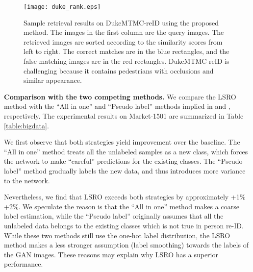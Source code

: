 \documentclass[10pt,twocolumn,letterpaper]{article}
\begin{document}
\begin{figure}
\begin{center}
\texttt{[image: duke\_rank.eps]}
\end{center}
   \caption{Sample retrieval results on DukeMTMC-reID using the proposed method. The images in the first column are the query images. The retrieved images are sorted according to the similarity scores from left to right. The correct matches are in the blue rectangles, and the false matching images are in the red rectangles. DukeMTMC-reID is challenging because it contains pedestrians with occlusions and similar appearance.}
\label{fig:duke}
\end{figure} 

\textbf{Comparison with the two competing methods.}
We compare the LSRO method with the ``All in one'' and ``Pseudo label'' methods implied in \cite{odena2016semi,salimans2016improved} and \cite{lee2013pseudo}, respectively. The experimental results on Market-1501 are summarized in Table \ref{table:bigdata}. 

We first observe that both strategies yield improvement over the baseline. The ``All in one'' method treats all the unlabeled samples as a new class, which forces the network to make ``careful'' predictions for the existing  classes. The ``Pseudo label'' method gradually labels the new data, and thus introduces more variance to the network. 

Nevertheless, we find that LSRO exceeds both strategies by approximately +1\%  +2\%. We speculate the reason is that the ``All in one'' method makes a coarse label estimation, while the ``Pseudo label'' originally assumes that all the unlabeled data belongs to the existing classes \cite{lee2013pseudo} which is not true in person re-ID. While these two methods still use the one-hot label distribution, the LSRO method makes a less stronger assumption (label smoothing) towards the labels of the GAN images. These reasons may explain why LSRO has a superior performance.
\end{document}
